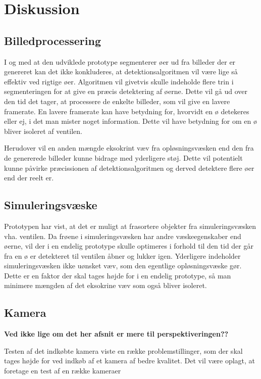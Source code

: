 \chapter{Diskussion}

\section{Billedprocessering}
I og med at den udviklede prototype segmenterer øer ud fra billeder der er genereret kan det ikke konkluderes, at detektionsalgoritmen vil være lige så effektiv ved rigtige øer. Algoritmen vil givetvis skulle indeholde flere trin i segmenteringen for at give en præcis detektering af øerne. Dette vil gå ud over den tid det tager, at processere de enkelte billeder, som vil give en lavere framerate. En lavere framerate kan have betydning for, hvorvidt en ø detekeres eller ej, i det man mister noget information. Dette vil have betydning for om en ø bliver isoleret af ventilen.

Herudover vil en anden mængde eksokrint væv fra opløsningsvæsken end den fra de genererede billeder kunne bidrage med yderligere støj. Dette vil potentielt kunne påvirke præcissionen af detektionsalgoritmen og derved detektere flere øer end der reelt er. 
\section{Simuleringsvæske}
Prototypen har vist, at det er muligt at frasortere objekter fra simuleringsvæsken vha. ventilen. Da frøene i simuleringsvæsken har andre væskeegenskaber end øerne, vil der i en endelig prototype skulle optimeres i forhold til den tid der går fra en ø er detekteret til ventilen åbner og lukker igen. Yderligere indeholder simuleringsvæsken ikke uønsket væv, som den egentlige opløsningsvæske gør. Dette er en faktor der skal tages højde for i en endelig prototype, så man minimere mængden af det eksokrine væv som også bliver isoleret.

\section{Kamera}
\textbf{Ved ikke lige om det her afsnit er mere til perspektiveringen??}

Testen af det indkøbte kamera viste en række problemstillinger, som der skal tages højde for ved indkøb af et kamera af bedre kvalitet. Det vil være oplagt, at foretage en test af en række kameraer
